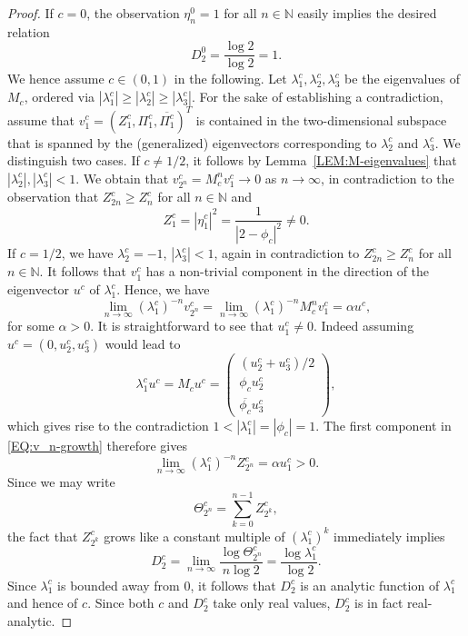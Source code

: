 \documentclass[11pt,reqno]{amsart}
\theoremstyle{plain}
\theoremstyle{definition}
\newcommand{\N}{{\mathbb N}}
\begin{document}
\begin{proof}
If $c=0$, the observation $\eta_n^{0} = 1$ for all $n \in \N$ easily implies the desired relation
\[
D_2^{0} = \frac{\log 2}{\log 2} = 1.
\]
We hence assume $c \in (0,1)$ in the following. Let $\lambda_1^{c},\lambda_2^{c},\lambda_3^{c}$ be the eigenvalues of $M_{c}$, ordered via $|\lambda_1^{c}| \geqslant |\lambda_2^{c}| \geqslant |\lambda_3^{c}|$.
For the sake of establishing a contradiction, assume that $v_1^{c} = ({Z}_1^{c},\Pi_1^{c},\overline{\Pi_1^{c}})^T$ is contained in the two-dimensional subspace that is spanned by the (generalized) eigenvectors corresponding to $\lambda_2^{c}$ and $\lambda_3^{c}$.
We distinguish two cases. 
If $c \neq 1/2$, it follows by Lemma~\ref{LEM:M-eigenvalues} that $|\lambda_2^{c}|,|\lambda_3^{c}| < 1$. We obtain that $v_{2^n}^{c} = M_{c}^n v_1^{c} \to 0$ as $n \to \infty$, in contradiction to the observation that $Z_{2n}^{c} \geqslant Z_n^{c}$ for all $n \in \N$ and 
\[
Z_1^{c} = |\eta_1^{c}|^2 = \frac{1}{|2 - \phi_{c}|^2} \neq 0.
\]
If $c = 1/2$, we have $\lambda_2^{c} = -1$, $|\lambda_3^{c}| < 1$, again in contradiction to $Z_{2n}^{c} \geqslant Z_n^{c}$ for all $n \in \N$.
It follows that $v_1^{c}$ has a non-trivial component in the direction of the eigenvector $u^{c}$ of $\lambda_1^{c}$.
Hence, we have
\begin{equation}
\label{EQ:v_n-growth}
\lim_{n \to \infty} (\lambda_1^{c})^{-n} v_{2^n}^{c}  = \lim_{n \to \infty} (\lambda_1^{c})^{-n} M^n_{c} v_1^{c} = \alpha u^{c},
\end{equation}
for some $\alpha > 0$. It is straightforward to see that $u_1^{c} \neq 0$. Indeed assuming $u^{c} = (0,u_2^{c},u_3^{c})$ would lead to
\[
\lambda_1^{c} u^{c} = M_{c} u^{c} = \begin{pmatrix}
(u_2^{c} + u_3^{c})/2
\\ \phi_{c} u_2^{c}
\\ \overline{\phi_{c}} u_3^{c} 
\end{pmatrix},
\]
which gives rise to the contradiction $1 < |\lambda_1^{c}| = |\phi_{c}| = 1$. The first component in \eqref{EQ:v_n-growth} therefore gives
\[
\lim_{n \to \infty} (\lambda_1^{c})^{-n} Z_{2^n}^{c} = \alpha u_1^{c} > 0.
\]
Since we may write
\[
\Theta_{2^n}^{c} = \sum_{k = 0}^{n-1} Z_{2^k}^{c},
\]
the fact that $Z_{2^k}^{c}$ grows like a constant multiple of $(\lambda_1^c)^k$
immediately implies  
\[
D_2^{c} = \lim_{ n \to \infty} \frac{\log \Theta_{2^n}^{c}}{n \log 2} = \frac{\log \lambda_1^{c}}{\log 2}.
\]
Since $\lambda_1^{c}$ is bounded away from $0$, it follows that $D_2^{c}$ is an analytic function of $\lambda_1^{c}$ and hence of $c$. Since both $c$ and $D_2^{c}$ take only real values, $D_2^{c}$ is in fact real-analytic.
\end{proof}
\end{document}
